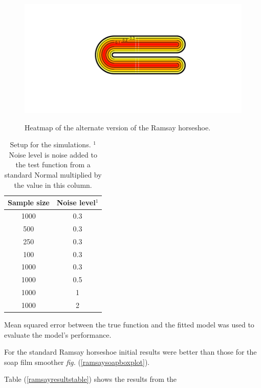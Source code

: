 \documentclass[a4paper,10pt]{amsart}
\newcommand{\fig}[1]{\emph{fig.} (\ref{#1})}
\begin{document}
\begin{figure}
\centering
\includegraphics[trim=0.5in 1in 0in 0.5in]{figs/altramsayhorseshoe.pdf} \\
\caption{Heatmap of the alternate version of the Ramsay horseshoe.}
\label{altramsayshorseshoe}
\end{figure}

\begin{table}[ht]
\begin{tabular}{c c}\\
Sample size & Noise level$^{1}$ \\
\hline
\hline
1000 & 0.3 \\
500 & 0.3 \\
250 & 0.3 \\
100 & 0.3 \\
1000 & 0.3 \\
1000 & 0.5 \\
1000 & 1 \\
1000 & 2 \\
\end{tabular}
\caption{Setup for the simulations. $^{1}$Noise level is noise added to the test function from a standard Normal multiplied by the value in this column. }
\end{table}

Mean squared error between the true function and the fitted model was used to evaluate the model's performance.

For the standard Ramsay horseshoe initial results were better than those for the soap film smoother \fig{ramsaysoapboxplot}.


Table (\ref{ramsayresultstable}) shows the results from the 
\end{document}

